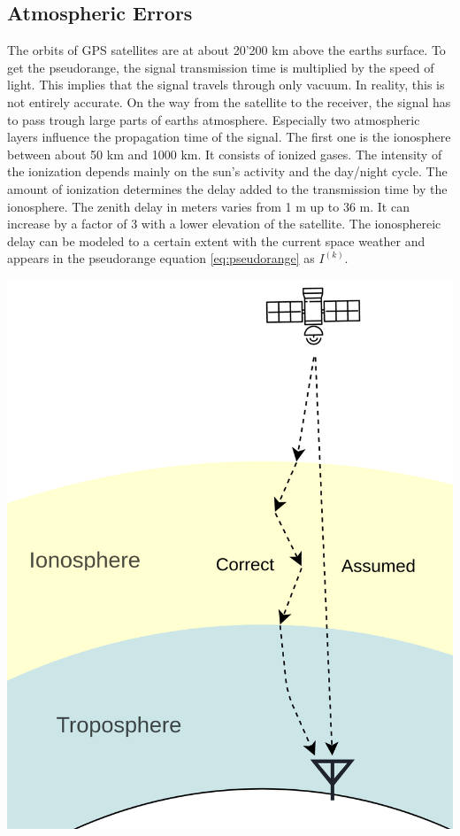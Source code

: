 \subsection{Atmospheric Errors}

\begin{minipage}{0.6\textwidth}
  The orbits of GPS satellites are at about 20'200 km above the earths surface.
  To get the pseudorange, the signal transmission time is multiplied by the speed of light.
  This implies that the signal travels through only vacuum.
  In reality, this is not entirely accurate.
  On the way from the satellite to the receiver, the signal has to pass trough large parts of earths atmosphere.
  Especially two atmospheric layers influence the propagation time of the signal.
  The first one is the ionosphere between about 50 km and 1000 km.
  It consists of ionized gases.
  The intensity of the ionization depends mainly on the sun's activity and the day/night cycle.
  The amount of ionization determines the delay added to the transmission time by the ionosphere.
  The zenith delay in meters varies from 1 m up to 36 m. 
  It can increase by a factor of 3 with a lower elevation of the satellite.
  The ionosphereic delay can be modeled to a certain extent with the current space weather and appears in the pseudorange equation \ref{eq:pseudorange} as $I^{(k)}$.
\end{minipage}
\hfill
\begin{minipage}{0.38\textwidth}
 \includegraphics[width=\textwidth]{images/Atmospheric_Errors.png}
\end{minipage}

